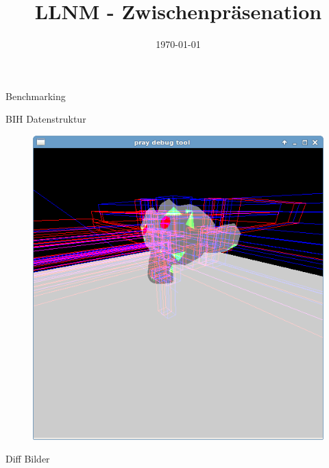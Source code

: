 


\title[LLNM]{LLNM - Zwischenpräsenation}
\subtitle{}
\date{\today}

	\begin{frame}
		\titlepage
	\end{frame}
	\begin{frame}{Benchmarking}
		
	\end{frame}
	\begin{frame}{BIH Datenstruktur}
		\begin{figure}[ht]
		\includegraphics[height=0.8\textheight]{images/bih2.png}
		\end{figure}
	\end{frame}

	\begin{frame}{Diff Bilder}
	\end{frame}

